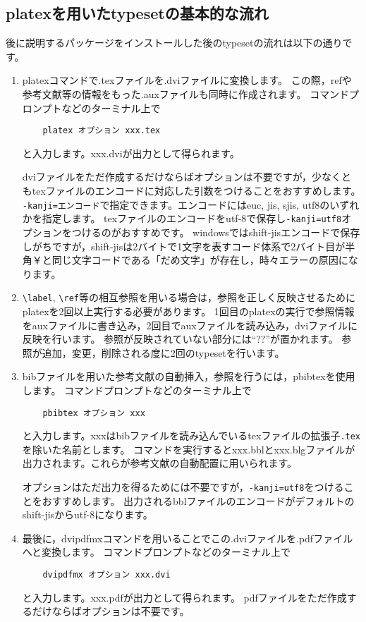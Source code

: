 \documentclass[10pt,a4paper,oneside,twocolumn,fleqn,dvipdfmx]{jsarticle}
\begin{document}
\subsection{platexを用いたtypesetの基本的な流れ}
後に説明するパッケージをインストールした後のtypesetの流れは以下の通りです。
\begin{enumerate}
\item platexコマンドで.texファイルを.dviファイルに変換します。
この際，refや参考文献等の情報をもった.auxファイルも同時に作成されます。
コマンドプロンプトなどのターミナル上で
\begin{verbatim}
	platex オプション xxx.tex 
\end{verbatim}
と入力します。xxx.dviが出力として得られます。

dviファイルをただ作成するだけならばオプションは不要ですが，少なくともtexファイルのエンコードに対応した引数をつけることをおすすめします。
\verb|-kanji=エンコード|で指定できます。エンコードにはeuc, jis, sjis, utf8のいずれかを指定します。
texファイルのエンコードをutf-8で保存し\verb|-kanji=utf8|オプションをつけるのがおすすめです。
windowsではshift-jisエンコードで保存しがちですが，shift-jisは2バイトで1文字を表すコード体系で2バイト目が半角￥と同じ文字コードである「だめ文字」が存在し，時々エラーの原因になります。

\item
\verb|\label|, \verb|\ref|等の相互参照を用いる場合は，参照を正しく反映させるためにplatexを2回以上実行する必要があります。
1回目のplatexの実行で参照情報をauxファイルに書き込み，2回目でauxファイルを読み込み，dviファイルに反映を行います。
参照が反映されていない部分には``??''が置かれます。
参照が追加，変更，削除される度に2回のtypesetを行います。

\item
bibファイルを用いた参考文献の自動挿入，参照を行うには，pbibtexを使用します。
コマンドプロンプトなどのターミナル上で
\begin{verbatim}
	pbibtex オプション xxx
\end{verbatim}
と入力します。xxxはbibファイルを読み込んでいるtexファイルの拡張子\texttt{.tex}を除いた名前とします。
コマンドを実行するとxxx.bblとxxx.blgファイルが出力されます。これらが参考文献の自動配置に用いられます。

オプションはただ出力を得るためには不要ですが，\verb|-kanji=utf8|をつけることをおすすめします。
出力されるbblファイルのエンコードがデフォルトのshift-jisからutf-8になります。

\item 最後に，dvipdfmxコマンドを用いることでこの.dviファイルを.pdfファイルへと変換します。
コマンドプロンプトなどのターミナル上で
\begin{verbatim}
	dvipdfmx オプション xxx.dvi 
\end{verbatim}
と入力します。xxx.pdfが出力として得られます。
pdfファイルをただ作成するだけならばオプションは不要です。
\end{enumerate}
\end{document}
